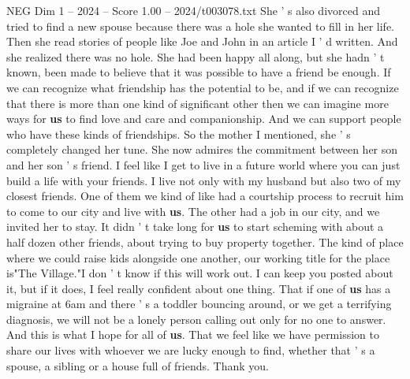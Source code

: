 \begin{textsample}{NEG Dim 1 – 2024 – Score 1.00 – 2024/t003078.txt}
She ' s also divorced and tried to find a new spouse because there was a hole she wanted to fill in her life.
Then she read stories of people like Joe and John in an article I ' d written.
And she realized there was no hole.
She had been happy all along, but she hadn ' t known, been made to believe that it was possible to have a friend be enough.
If we can recognize what friendship has the potential to be, and if we can recognize that there is more than one kind of significant other then we can imagine more ways for \textbf{us} to find love and care and companionship.
And we can support people who have these kinds of friendships.
So the mother I mentioned, she ' s completely changed her tune.
She now admires the commitment between her son and her son ' s friend.
I feel like I get to live in a future world where you can just build a life with your friends.
I live not only with my husband but also two of my closest friends.
One of them we kind of like had a courtship process to recruit him to come to our city and live with \textbf{us}.
The other had a job in our city, and we invited her to stay.
It didn ' t take long for \textbf{us} to start scheming with about a half dozen other friends, about trying to buy property together.
The kind of place where we could raise kids alongside one another, our working title for the place is"The Village."I don ' t know if this will work out.
I can keep you posted about it, but if it does, I feel really confident about one thing.
That if one of \textbf{us} has a migraine at 6am and there ' s a toddler bouncing around, or we get a terrifying diagnosis, we will not be a lonely person calling out only for no one to answer.
And this is what I hope for all of \textbf{us}.
That we feel like we have permission to share our lives with whoever we are lucky enough to find, whether that ' s a spouse, a sibling or a house full of friends.
Thank you.

\end{textsample}
